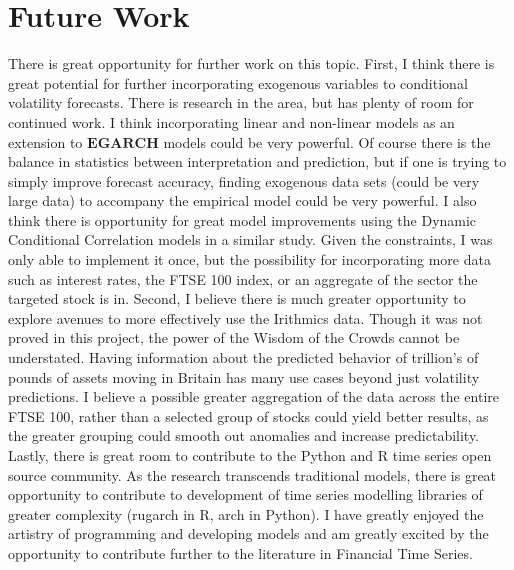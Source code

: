 \section{Future Work}
There is great opportunity for further work on this topic. First, I think there is great potential for further incorporating exogenous variables to conditional volatility forecasts. There is research in the area, but has plenty of room for continued work. I think incorporating linear and non-linear models as an extension to $\mathbf{EGARCH}$ models could be very powerful. Of course there is the balance in statistics between interpretation and prediction, but if one is trying to simply improve forecast accuracy, finding exogenous data sets (could be very large data) to accompany the empirical model could be very powerful. I also think there is opportunity for great model improvements using the Dynamic Conditional Correlation models in a similar study. Given the constraints, I was only able to implement it once, but the possibility for incorporating more data such as interest rates, the FTSE 100 index, or an aggregate of the sector the targeted stock is in. Second, I believe there is much greater opportunity to explore avenues to more effectively use the Irithmics data. Though it was not proved in this project, the power of the Wisdom of the Crowds cannot be understated. Having information about the predicted behavior of trillion's of pounds of assets moving in Britain has many use cases beyond just volatility predictions. I believe a possible greater aggregation of the data across the entire FTSE 100, rather than a selected group of stocks could yield better results, as the greater grouping could smooth out anomalies and increase predictability. Lastly, there is great room to contribute to the Python and R time series open source community. As the research transcends traditional models, there is great opportunity to contribute to development of time series modelling libraries of greater complexity (rugarch in R, arch in Python). I have greatly enjoyed the artistry of programming and developing models and am greatly excited by the opportunity to contribute further to the literature in Financial Time Series. 

